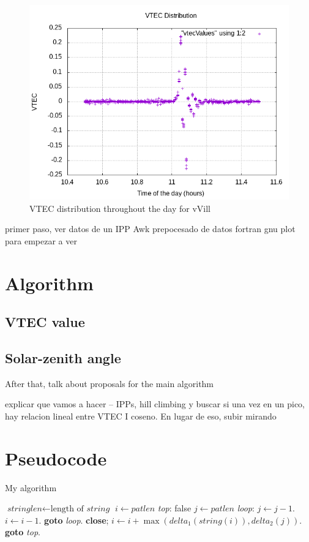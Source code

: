 \begin{figure}[ht]
	\centering
	\includegraphics[width=0.6\linewidth]{images/ch4/vtecDistributionVill.png}
	\caption{VTEC distribution throughout the day for vVill}
	\label{fig:vtecDistributionVill}
\end{figure}


primer paso, ver datos de un IPP
Awk prepocesado de datos
fortran
gnu plot para empezar a ver

\section{Algorithm}

\subsection{VTEC value}

\subsection{Solar-zenith angle}









After that, talk about proposals for the main algorithm

explicar que vamos a hacer – IPPs, hill climbing y buscar si una vez en un pico, hay relacion lineal entre VTEC I coseno. En lugar de eso, subir mirando






\section{Pseudocode}

\begin{algorithm}
	\caption{My algorithm}\label{euclid}
	\begin{algorithmic}[1]
		\State $\textit{stringlen} \gets \text{length of }\textit{string}$
		\State $i \gets \textit{patlen}$
		\BState \emph{top}:
		 \Return false
		\EndIf
		\State $j \gets \textit{patlen}$
		\BState \emph{loop}:
		\State $j \gets j-1$.
		\State $i \gets i-1$.
		\State \textbf{goto} \emph{loop}.
		\State \textbf{close};
		\EndIf
		\State $i \gets i+\max(\textit{delta}_1(\textit{string}(i)),\textit{delta}_2(j))$.
		\State \textbf{goto} \emph{top}.
		\EndProcedure
	\end{algorithmic}
\end{algorithm}

